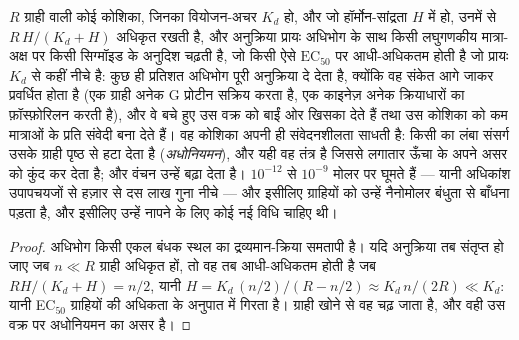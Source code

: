 \begin{proposition}[मात्रा और अनुक्रिया]\label{prop:b3:endocrinology:dose}
$R$ ग्राही वाली कोई कोशिका, जिनका वियोजन-अचर $K_{d}$ हो, और जो हॉर्मोन-सांद्रता
$H$ में हो, उनमें से $R\,H/(K_{d} + H)$ अधिकृत रखती है, और अनुक्रिया
प्रायः अधिभोग के साथ किसी लघुगणकीय मात्रा-अक्ष पर किसी सिग्मॉइड के
अनुदिश चढ़ती है, जो किसी ऐसे $\text{EC}_{50}$ पर आधी-अधिकतम होती है जो
प्रायः $K_{d}$ से कहीं नीचे है: कुछ ही प्रतिशत अधिभोग पूरी अनुक्रिया दे
देता है, क्योंकि वह संकेत आगे जाकर प्रवर्धित होता है (एक ग्राही अनेक
G प्रोटीन सक्रिय करता है, एक काइनेज़ अनेक क्रियाधारों का फ़ॉस्फ़ोरिलन
करती है), और वे बचे हुए \emph{} उस वक्र को बाईं ओर
खिसका देते हैं तथा उस कोशिका को कम मात्राओं के प्रति संवेदी बना देते
हैं। वह कोशिका अपनी ही संवेदनशीलता साधती है: किसी  का लंबा संसर्ग
उसके ग्राही पृष्ठ से हटा देता है (\emph{अधोनियमन}), और यही वह तंत्र है
जिससे लगातार ऊँचा   के अपने असर को कुंद कर देता है; और
वंचन उन्हें बढ़ा देता है।  $10^{-12}$ से $10^{-9}$ मोलर पर घूमते
हैं --- यानी अधिकांश उपापचयजों से हज़ार से दस लाख गुना नीचे --- और
इसीलिए ग्राहियों को उन्हें नैनोमोलर बंधुता से बाँधना पड़ता है, और
इसीलिए उन्हें नापने के लिए कोई नई विधि चाहिए थी।
\end{proposition}
\begin{proof}
अधिभोग किसी एकल बंधक स्थल का द्रव्यमान-क्रिया समतापी है। यदि अनुक्रिया
तब संतृप्त हो जाए जब $n \ll R$ ग्राही अधिकृत हों, तो वह तब
आधी-अधिकतम होती है जब $R H/(K_{d} + H) = n/2$, यानी $H = K_{d}\,
(n/2)/(R - n/2) \approx K_{d}\, n/(2R) \ll K_{d}$: यानी EC$_{50}$
ग्राहियों की अधिकता के अनुपात में गिरता है। ग्राही खोने से वह चढ़ जाता
है, और वही उस वक्र पर अधोनियमन का असर है।
\end{proof}

